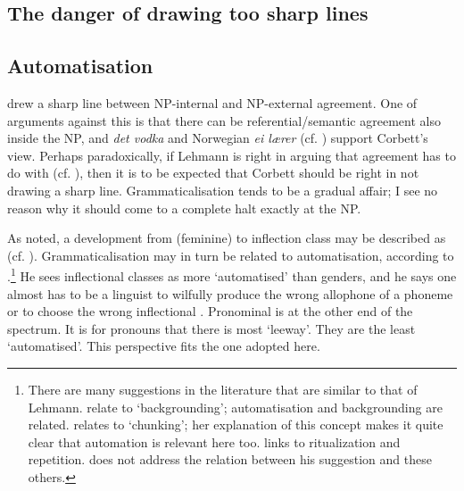 \documentclass[output=paper]{langsci/langscibook}
\begin{document}
\begin{exe}
\begin{xlist}
\begin{xlist}
\section{The danger of drawing too sharp lines}

\subsection{Automatisation}
\label{sec:enger:4.1}

%
\citet{Lehmann82} %
%
drew a sharp line between NP-internal and NP-external
agreement. One of %
%
arguments against this is that there
can be referential/semantic agreement also inside the NP, and 
\emph{det vodka} and Norwegian \emph{ei lærer} (cf. ) support
Corbett's view. Perhaps paradoxically, if Lehmann is right in arguing
that agreement has to do with  (cf. ), then it is
to be expected that Corbett should be right in not drawing a sharp line.
Grammaticalisation  tends to be a gradual affair; I see no reason why it
should come to a complete halt exactly at the NP.

As noted, a development from (feminine)  to inflection class may
be described as  (cf. ). Grammaticalisation  may in
turn be related to automatisation, according to %
\citet{Lehmann16}%
%
.\footnote{There are many suggestions in the literature that are
  similar to that of Lehmann. %
\citet{Boye12} %
%
relate
   to `backgrounding'; automatisation and
  backgrounding are related. %
\citet{Bybee03} %
%
relates  to
  `chunking'; her explanation of this concept makes it quite clear that
  automation is relevant here too. %
\citet{Haiman94} %
%
links
   to ritualization and repetition. %
\citet{Lehmann16}  does not address the relation between his suggestion and these others.}
He sees inflectional classes as more `automatised' than genders, and he
says one almost has to be a linguist to wilfully produce the wrong
allophone of a phoneme or to choose the wrong inflectional .
Pronominal  is at the other end of the spectrum. It is for
pronouns that there is most `leeway'. They are the least `automatised'.
This perspective fits the one adopted here.


\end{xlist}
\end{xlist}
\end{exe}
\end{document}
